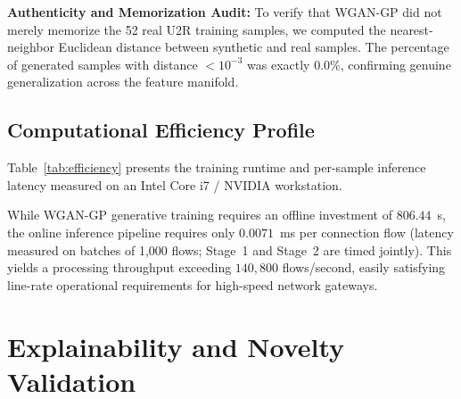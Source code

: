 \documentclass[journal]{IEEEtran}
\begin{document}
\textbf{Authenticity and Memorization Audit:} To verify that WGAN-GP did not merely memorize the 52 real U2R training samples, we computed the nearest-neighbor Euclidean distance between synthetic and real samples. The percentage of generated samples with distance $< 10^{-3}$ was exactly $0.0\%$, confirming genuine generalization across the feature manifold.

\subsection{Computational Efficiency Profile}
Table~\ref{tab:efficiency} presents the training runtime and per-sample inference latency measured on an Intel Core i7 / NVIDIA workstation.

\begin{table}[htbp]
\centering
\caption{Computational Runtime and Inference Throughput. Latency measured on batches of 1,000 flows; Stage~1 and Stage~2 inference is timed jointly for two-stage methods.}
\label{tab:efficiency}
\end{table}

While WGAN-GP generative training requires an offline investment of $806.44$~s, the online inference pipeline requires only $0.0071$~ms per connection flow (latency measured on batches of 1,000 flows; Stage~1 and Stage~2 are timed jointly). This yields a processing throughput exceeding $140,800$ flows/second, easily satisfying line-rate operational requirements for high-speed network gateways.

\section{Explainability and Novelty Validation}
\label{sec:explainability}
\end{document}

